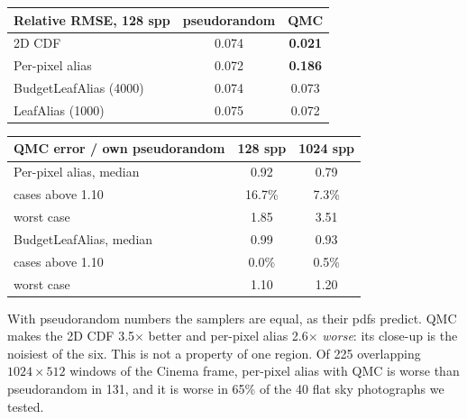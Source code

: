 \documentclass[10pt]{article}
\begin{document}
\begin{table}[H]
\centering\small
\begin{minipage}[t]{0.42\linewidth}\centering\vspace{0pt}
\begin{tabular}{lcc}
\toprule
Relative RMSE, 128 spp & pseudorandom & QMC \\
\midrule
2D CDF & 0.074 & \textbf{0.021} \\
Per-pixel alias & 0.072 & \textbf{0.186} \\
BudgetLeafAlias (4000) & 0.074 & 0.073 \\
LeafAlias (1000) & 0.075 & 0.072 \\
\bottomrule
\end{tabular}
\label{tab:fence}
\end{minipage}\hfill
\begin{minipage}[t]{0.54\linewidth}\centering\vspace{0pt}
\begin{tabular}{lcc}
\toprule
QMC error / own pseudorandom & 128 spp & 1024 spp \\
\midrule
Per-pixel alias, median & 0.92 & 0.79 \\
\quad cases above 1.10 & 16.7\% & 7.3\% \\
\quad worst case & 1.85 & 3.51 \\
BudgetLeafAlias, median & 0.99 & 0.93 \\
\quad cases above 1.10 & 0.0\% & 0.5\% \\
\quad worst case & 1.10 & 1.20 \\
\bottomrule
\end{tabular}
\label{tab:robust}
\end{minipage}
\end{table}

With pseudorandom numbers the samplers are equal, as their pdfs predict. QMC makes the 2D CDF 3.5$\times$ better and per-pixel alias 2.6$\times$ \emph{worse}: its close-up is the noisiest of the six. This is not a property of one region. Of 225 overlapping $1024\times512$ windows of the Cinema frame, per-pixel alias with QMC is worse than pseudorandom in 131, and it is worse in 65\% of the 40 flat sky photographs we tested.
\end{document}
